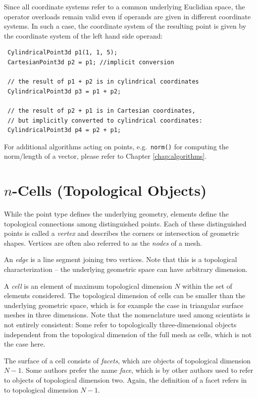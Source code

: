 Since all coordinate systems refer to a common underlying Euclidian space, the operator overloads remain valid even if operands are given in different coordinate systems. In such a case, the coordinate system of the resulting point is given by the coordinate system of the left hand side operand:
\begin{lstlisting}
 CylindricalPoint3d p1(1, 1, 5);
 CartesianPoint3d p2 = p1; //implicit conversion

 // the result of p1 + p2 is in cylindrical coordinates
 CylindricalPoint3d p3 = p1 + p2;

 // the result of p2 + p1 is in Cartesian coordinates,
 // but implicitly converted to cylindrical coordinates:
 CylindricalPoint3d p4 = p2 + p1;
\end{lstlisting}
For additional algorithms acting on points, e.g.~\lstinline|norm()| for computing the norm/length of a vector, please refer to Chapter \ref{chap:algorithms}.


\section{$n$-Cells (Topological Objects)} \label{sec:ncells}
While the point type defines the underlying geometry, elements define the topological connections among distinguished points. Each of these distinguished points is called a \emph{vertex} and describes the corners or intersection of geometric shapes. Vertices are often also referred to as the \emph{nodes} of a mesh.

An \emph{edge} is a line segment joining two vertices. Note that this is a topological characterization -- the underlying geometric space can have arbitrary dimension.

A \emph{cell} is an element of maximum topological dimension $N$ within the set of elements considered. The topological dimension of cells can be smaller than the underlying geometric space, which is for example the case in triangular surface meshes in three dimensions. Note that the nomenclature used among scientists is not entirely consistent: Some refer to topologically three-dimensional objects independent from the topological dimension of the full mesh as cells, which is not the case here. 

The surface of a cell consists of \emph{facets}, which are objects of topological dimension $N-1$. Some authors prefer the name \emph{face}, which is by other authors used to refer to objects of topological dimension two. Again, the definition of a facet refers in {\ViennaGrid} to topological dimension $N-1$.

